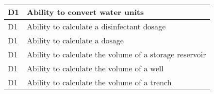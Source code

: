 \begin{table}[H]
\begin{tabular}{| m{1cm} | m{15cm} |}
D1 & Ability to convert   water units                                             \\ \hline
D1 & Ability to calculate   a disinfectant dosage                                 \\ \hline
D1 & Ability to calculate   a dosage                                              \\ \hline
D1 & Ability to calculate   the volume of a storage reservoir                     \\ \hline
D1 & Ability to calculate   the volume of a well                                  \\ \hline
D1 & Ability to calculate   the volume of a trench                                \\ \hline

\end{tabular}
\end{table}

\newpage




